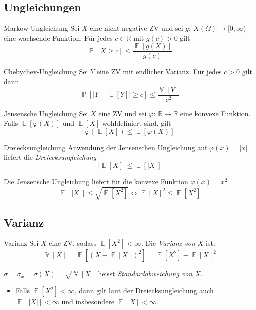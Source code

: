 \documentclass[a4paper,10pt]{article}
\def\R{\mathbb{R}}
\renewcommand{\P}{\operatorname{\mathbb{P}}}
\DeclareMathOperator{\E}{\mathbb{E}}
\DeclareMathOperator{\V}{\mathbb{V}}
\numberwithin{equation}{section}
\begin{document}
\subsection{Ungleichungen}

\begin{mainbox}{Markow-Ungleichung}
    Sei \( X \) eine nicht-negative ZV und sei \( g: \: X(\Omega) \to [0, \infty) \) eine wachsende Funktion. Für jedes \( c \in \R \) mit \( g(c) > 0 \) gilt
    \[
        \P[X \geq c] \leq \frac{\E[g(X)]}{g(c)}
    \]
\end{mainbox}

\begin{subbox}{Chebychev-Ungleichung}
    Sei \( Y \) eine ZV mit endlicher Varianz. Für jedes \( c > 0 \) gilt dann
    \[
        \P[|Y - \E[Y]| \geq c] \leq \frac{\V[Y]}{c^2}
    \]
\end{subbox}

\begin{mainbox}{Jensensche Ungleichung}
    Sei \( X \) eine ZV und sei \( \varphi: \: \R \to \R \) eine konvexe Funktion. Falls \( \E[\varphi(X)] \) und \( \E[X] \) wohldefiniert sind, gilt
    \[
        \varphi(\E[X]) \leq \E[\varphi(X)]
    \]
\end{mainbox}

\begin{subbox}{Dreiecksungleichung}
    Anwendung der Jensenschen Ungleichung auf \( \varphi(x) = |x| \) liefert die \emph{Dreiecksungleichung}
    \[
        |\E[X]| \leq \E[|X|]
    \]
\end{subbox}

Die Jensensche Ungleichung liefert für die konvexe Funktion \( \varphi(x) = x^2 \)
\[
    \E[|X|] \leq \sqrt{\E[X^2]} \iff \E[X]^2 \leq \E[X^2]
\]

\subsection{Varianz}

\begin{mainbox}{Varianz}
    Sei \( X \) eine ZV, sodass \( \E[X^2] < \infty \). Die \emph{Varianz von \( X \)} ist:
    \[
        \V[X] = \E[(X - \E[X])^2] = \E[X^2] - \E[X]^2
    \]

    \( \sigma = \sigma_x = \sigma(X) = \sqrt{\V[X]} \) heisst \emph{Standardabweichung von \( X \)}.
\end{mainbox}

\begin{itemize}
    \item Falls \( \E[X^2] < \infty \), dann gilt laut der Dreiecksungleichung auch \( \E[|X|] < \infty \) und insbesondere \( \E[X] < \infty \).
\end{itemize}
\end{document}
